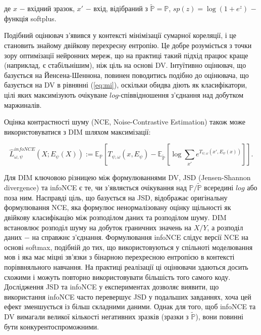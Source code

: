 \noindent де $x$ $-$ вхідний зразок, \newline
\hspace*{15pt} $x'$ $-$ вхід, відібраний з $\tilde{\mathbb{P}} = \mathbb{P}$, \newline
\hspace*{15pt} $sp(z) = \log{(1 + e^{z})}$ $-$ функція softplus. 

\vspace{1.5em}

Подібний оцінювач з'явився у контексті мінімізації сумарної кореляції, і це становить знайому двійкову перехресну ентропію. Це добре розуміється з точки зору оптимізації нейронних мереж, що на практиці такий підхід працює краще (наприклад, є стабільнішим), ніж ціль на основі DV. Інтуїтивно оцінювач, що базується на Йенсена-Шеннона, повинен поводитись подібно до оцінювача, що базується на DV в рівнянні (\ref{eq:mi}), оскільки обидва діють як класифікатори, цілі яких максимізують очікуване $log$-співвідношення з'єднання над добутком маржиналів.

Оцінка контрастності шуму (NCE, Noise-Contrastive Estimation) також може використовуватися з DIM шляхом максимізації:

\begin{equation}\label{eq:dim}
\hat{L}_{\omega,\psi}^{infoNCE}(X; E_{\psi}(X)) := \mathbb{E_{P}}\left[T_{\psi,\omega}(x, E_{\psi}) - \mathbb{E_{\tilde{P}}}\left[\log{\sum_{x'}{e^{T_{\psi, \omega}(x', E_{\psi}(x))}}}\right]\right].
\end{equation}

\vspace{1.5em}

Для DIM ключовою різницею між формулюваннями DV, JSD (Jensen-Shannon divergence) та infoNCE є те, чи з'являється очікування над $\mathbb{P / \tilde{P}}$ всередині $log$ або поза ним. Насправді ціль, що базується на JSD, відображає оригінальну формулювання NCE, яка формулює ненормалізовану оцінку щільності як двійкову класифікацію між розподілом даних та розподілом шуму. DIM встановлює розподіл шуму на добуток граничних значень на $X / Y$, а розподіл даних $-$ на справжнє з'єднання. Формулювання infoNCE слідує версії NCE на основі softmax, подібній до тих, що використовуються у спільноті моделювання мов і яка має міцні зв'язки з бінарною перехресною ентропією в контексті поріввняльного навчання. На практиці реалізації ці оцінювачи здаються досить схожими і можуть повторно використовувати більшість того самого коду. Дослідження JSD та infoNCE у експериментах дозволяє виявити, що використання infoNCE часто перевершує JSD у подальших завданнях, хоча цей ефект зменшується із більш складними даними. Однак для того, щоб infoNCE та DV вимагали великої кількості негативних зразків (зразки з $\mathbb{\tilde{P}}$), вони повинні бути конкурентоспроможними.

